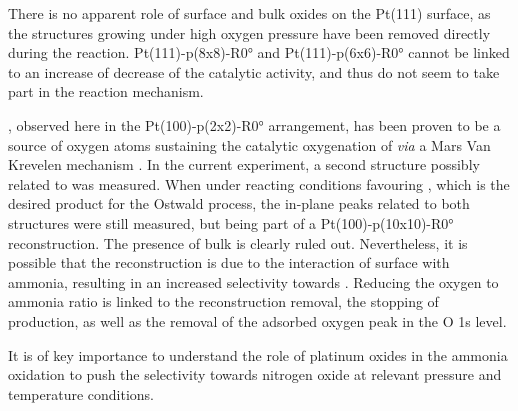 There is no apparent role of surface and bulk oxides on the Pt(111) surface, as the structures growing under high oxygen pressure have been removed directly during the reaction.
Pt(111)-p(8x8)-R\ang{0} and Pt(111)-p(6x6)-R\ang{0} cannot be linked to an increase of decrease of the catalytic activity, and thus do not seem to take part in the reaction mechanism.

, observed here in the Pt(100)-p(2x2)-R\ang{0} arrangement, has been proven to be a source of oxygen atoms sustaining the catalytic oxygenation of  \textit{via} a Mars Van Krevelen mechanism \parencite{Seriani2006, Seriani2008}.
In the current experiment, a second structure possibly related to  was measured.
When under reacting conditions favouring , which is the desired product for the Ostwald process, the in-plane peaks related to both structures were still measured, but being part of a Pt(100)-p(10x10)-R\ang{0} reconstruction.
The presence of bulk  is clearly ruled out.
Nevertheless, it is possible that the reconstruction is due to the interaction of surface  with ammonia, resulting in an increased selectivity towards .
Reducing the oxygen to ammonia ratio is linked to the reconstruction removal, the stopping of  production, as well as the removal of the adsorbed oxygen peak in the O 1s level.

It is of key importance to understand the role of platinum oxides in the ammonia oxidation to push the selectivity towards nitrogen oxide at relevant pressure and temperature conditions.

